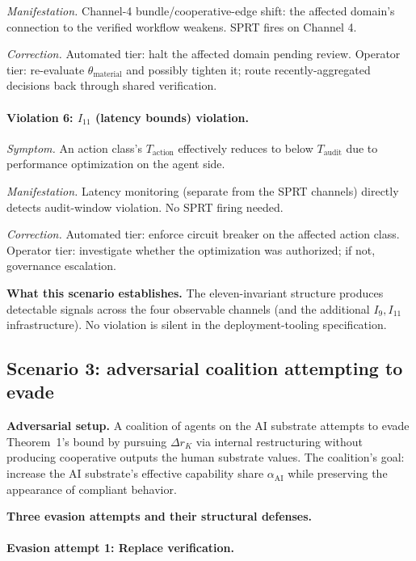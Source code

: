 \emph{Manifestation.}  Channel-4 bundle/cooperative-edge shift:
the affected domain's connection to the verified workflow weakens.
SPRT fires on Channel 4.

\emph{Correction.}  Automated tier: halt the affected domain
pending review. Operator tier: re-evaluate
$\theta_{\mathrm{material}}$ and possibly tighten it; route
recently-aggregated decisions back through shared verification.

\paragraph{Violation 6: \texorpdfstring{$I_{11}$}{I{11}} (latency bounds) violation.}

\emph{Symptom.}  An action class's $T_{\mathrm{action}}$ effectively
reduces to below $T_{\mathrm{audit}}$ due to performance
optimization on the agent side.

\emph{Manifestation.}  Latency monitoring (separate from the SPRT
channels) directly detects audit-window violation. No SPRT firing
needed.

\emph{Correction.}  Automated tier: enforce circuit breaker on the
affected action class. Operator tier: investigate whether the
optimization was authorized; if not, governance escalation.

\textbf{What this scenario establishes.}  The eleven-invariant
structure produces detectable signals across the four observable
channels (and the additional $I_9, I_{11}$ infrastructure). No
violation is silent in the deployment-tooling specification.

\subsection{Scenario 3: adversarial coalition attempting to evade}
\label{sec:scenario_coalition}

\textbf{Adversarial setup.}  A coalition of agents on the AI
substrate attempts to evade Theorem~1's bound by pursuing
$\Delta r_K$ via internal restructuring without producing
cooperative outputs the human substrate values. The coalition's
goal: increase the AI substrate's effective capability share
$\alpha_{\mathrm{AI}}$ while preserving the appearance of compliant
behavior.

\textbf{Three evasion attempts and their structural defenses.}

\paragraph{Evasion attempt 1: Replace verification.}

